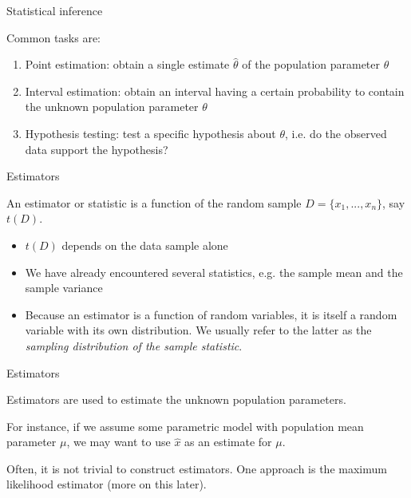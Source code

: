 \documentclass{beamer}
\begin{document}
\begin{frame}{Statistical inference}

	Common tasks are:
	\begin{enumerate}
		\item Point estimation: obtain a single estimate $\hat{\theta}$ of the population parameter $\theta$
		\item Interval estimation: obtain an interval having a certain probability
		to contain the unknown population parameter $\theta$
		\item Hypothesis testing: test a specific hypothesis about $\theta$, i.e. do the
		observed data support the hypothesis?
	\end{enumerate}

\end{frame}

\begin{frame}{Estimators}

	An estimator or statistic is a function of the random sample $D=\{x_1,...,x_n\}$, say $t(D)$.

	\begin{itemize}
		\item $t(D)$ depends on the data sample alone
		\item We have already encountered several statistics, e.g. the sample mean and the sample variance
		\item Because an estimator is a function of random variables, it is itself a
		random variable with its own distribution. We usually refer to the
		latter as the \textit{sampling distribution of the sample statistic}.
	\end{itemize}

\end{frame}

\begin{frame}{Estimators}

	Estimators are used to estimate the unknown population parameters.

	\vskip 0.5cm

	For instance, if we assume some parametric model with population mean parameter $\mu$, 
	we may want to use $\hat{x}$ as an estimate for $\mu$.

	\vskip 0.5cm

	Often, it is not trivial to construct estimators. One approach is the maximum likelihood estimator (more on this later).

\end{frame}
\end{document}
